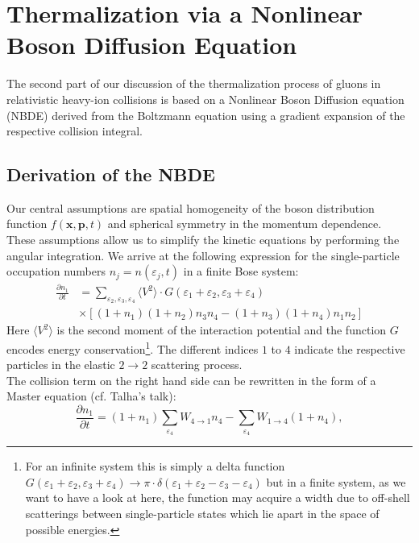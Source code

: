 \section[Nonlinear Boson Diffusion Equation]{Thermalization via a Nonlinear Boson Diffusion Equation}
The second part of our discussion of the thermalization process of gluons in relativistic heavy-ion collisions is based on a Nonlinear Boson Diffusion equation (NBDE) derived from the Boltzmann equation using a gradient expansion of the respective collision integral.
\subsection{Derivation of the NBDE}
Our central assumptions are spatial homogeneity of the boson distribution function $f(\mathbf{x},\mathbf{p},t)$ and spherical symmetry in the momentum dependence. These assumptions allow us to simplify the kinetic equations by performing the angular integration. We arrive at the following expression for the single-particle occupation numbers $n_j=n(\varepsilon_j,t)$ in a finite Bose system:
\begin{equation}
\begin{aligned}
\frac{\partial n_1}{\partial t} &= \sum_{\varepsilon_2,\varepsilon_3,\varepsilon_4}\langle V^{2}\rangle \cdot G(\varepsilon_1+\varepsilon_2,\varepsilon_3+\varepsilon_4)\\
&\times \left[(1+n_1)(1+n_2)n_3n_4 - (1+n_3)(1+n_4)n_1n_2\right]
\end{aligned}
\end{equation}
Here $\langle V^{2}\rangle$ is the second moment of the interaction potential and the function $G$ encodes energy conservation\footnote{For an infinite system this is simply a delta function $G(\varepsilon_1+\varepsilon_2,\varepsilon_3+\varepsilon_4)\rightarrow \pi\cdot\delta(\varepsilon_1 + \varepsilon_2 -\varepsilon_3 - \varepsilon_4)$ but in a finite system, as we want to have a look at here, the function may acquire a width due to off-shell scatterings between single-particle states which lie apart in the space of possible energies.}. The different indices $1$ to $4$ indicate the respective particles in the elastic $2\rightarrow 2$ scattering process.\\
\noindent 
The collision term on the right hand side can be rewritten in the form of a Master equation (cf. Talha's talk):
\begin{equation}
\frac{\partial n_1}{\partial t} = (1+n_1)\sum_{\varepsilon_4}W_{4\rightarrow 1}n_4	- \sum_{\varepsilon_4}W_{1\rightarrow 4}(1+n_4),	
\end{equation}

